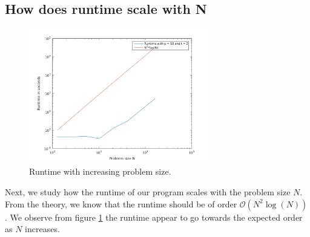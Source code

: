 \subsection*{How does runtime scale with N}
\begin{figure}[h!]
			\centering
			\includegraphics[width=0.7\textwidth]{./figures/runtimeN}
			\caption{Runtime with increasing problem size.}
			\label{fig:runtimeN}
\end{figure}
Next, we study how the runtime of our program scales with the problem size $N$. From the theory, we know that the runtime should be of order $\mathcal{O}(N^2\log(N))$. We observe from figure \ref{fig:runtimeN} the runtime appear to go towards the expected order as $N$ increases. 